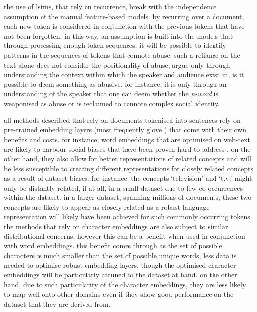 the use of lstms, that rely on recurrence, break with the independence assumption of the manual feature-based models.
by recurring over a document, each new token is considered in conjunction with the previous tokens that have not been forgotten.
in this way, an assumption is built into the models that through processing enough token sequences, it will be possible to identify patterns in the sequences of tokens that connote abuse.
such a reliance on the text alone does not consider the positionality of abuse; \citet{waseem:2018} argue only through understanding the context within which the speaker and audience exist in, is it possible to deem something as abusive.
for instance, it is only through an understanding of the speaker that one can deem whether the \textit{n-word} is weaponised as abuse or is reclaimed to connote complex social identity.
\vspace{5mm}

all methods described that rely on documents tokenised into sentences rely on pre-trained embedding layers (most frequently glove \citet{pennington:2014}) that come with their own benefits and costs.
for instance, word embeddings that are optimised on web-text are likely to harbour social biases \citep{bolukbasi:2016} that have been proven hard to address \citep{gonen:2019}.
on the other hand, they also allow for better representations of related concepts and will be less susceptible to creating different representations for closely related concepts as a result of dataset biases.
for instance, the concepts `television' and `t.v.' might only be distantly related, if at all, in a small dataset due to few co-occurrences within the dataset.
in a larger dataset, spanning millions of documents, these two concepts are likely to appear as closely related as a robust language representation will likely have been achieved for such commonly occurring tokens.
the methods that rely on character embeddings are also subject to similar distributional concerns, however this can be a benefit when used in conjunction with word embeddings.
this benefit comes through as the set of possible characters is much smaller than the set of possible unique words, less data is needed to optimise robust embedding layers, though the optimised character embeddings will be particularly attuned to the dataset at hand.
on the other hand, due to such particularity of the character embeddings, they are less likely to map well onto other domains even if they show good performance on the dataset that they are derived from.
\vspace{5mm}

